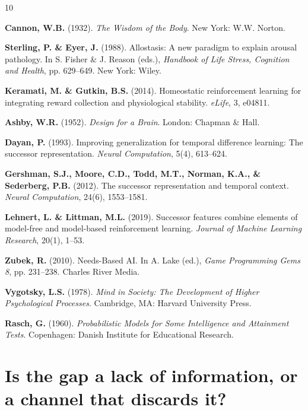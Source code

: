 \documentclass{article}
\begin{document}
{
\small

\begin{thebibliography}{10}

\textbf{Cannon, W.B.} (1932). \textit{The Wisdom of the Body}. New York: W.W. Norton.

\textbf{Sterling, P. \& Eyer, J.} (1988). Allostasis: A new paradigm to explain arousal pathology. In S. Fisher \& J. Reason (eds.), \textit{Handbook of Life Stress, Cognition and Health}, pp. 629--649. New York: Wiley.

\textbf{Keramati, M. \& Gutkin, B.S.} (2014). Homeostatic reinforcement learning for integrating reward collection and physiological stability. \textit{eLife}, 3, e04811.

\textbf{Ashby, W.R.} (1952). \textit{Design for a Brain}. London: Chapman \& Hall.

\textbf{Dayan, P.} (1993). Improving generalization for temporal difference learning: The successor representation. \textit{Neural Computation}, 5(4), 613--624.

\textbf{Gershman, S.J., Moore, C.D., Todd, M.T., Norman, K.A., \& Sederberg, P.B.} (2012). The successor representation and temporal context. \textit{Neural Computation}, 24(6), 1553--1581.

\textbf{Lehnert, L. \& Littman, M.L.} (2019). Successor features combine elements of model-free and model-based reinforcement learning. \textit{Journal of Machine Learning Research}, 20(1), 1--53.

\textbf{Zubek, R.} (2010). Needs-Based AI. In A. Lake (ed.), \textit{Game Programming Gems 8}, pp. 231--238. Charles River Media.

\textbf{Vygotsky, L.S.} (1978). \textit{Mind in Society: The Development of Higher Psychological Processes}. Cambridge, MA: Harvard University Press.

\textbf{Rasch, G.} (1960). \textit{Probabilistic Models for Some Intelligence and Attainment Tests}. Copenhagen: Danish Institute for Educational Research.

\end{thebibliography}
}

\newpage
\appendix

\section{Is the gap a lack of information, or a channel that discards it?}
\label{app:levelaware}
\end{document}
